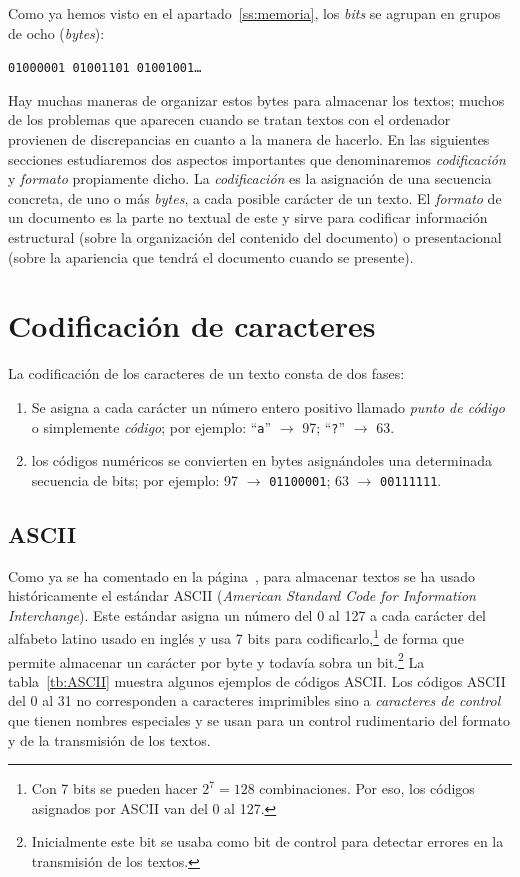 Como ya hemos visto en el apartado~\ref{ss:memoria}, los \emph{bits} se agrupan en grupos de ocho (\emph{bytes}): \begin{center} \texttt{01000001 01001101 01001001\ldots} \end{center} 

Hay muchas maneras de organizar estos bytes para almacenar los textos; muchos de los problemas que aparecen cuando se tratan textos con el ordenador provienen de discrepancias en cuanto a la manera de hacerlo. 
En las siguientes secciones estudiaremos dos aspectos importantes que denominaremos \emph{codificación} y \emph{formato} propiamente dicho. La \emph{codificación} es la asignación de una secuencia concreta, de uno o más \emph{bytes}, a cada posible carácter de un texto. El \emph{formato} de un documento es la parte no textual de este y sirve para codificar información estructural (sobre la organización del contenido del documento) o presentacional (sobre la apariencia que tendrá el documento cuando se presente). 

\section{Codificación de caracteres} La codificación de los caracteres de un texto consta de dos fases: \begin{enumerate} \item Se asigna a cada carácter un número entero positivo llamado \emph{punto de código} o simplemente \emph{código}; por ejemplo: ``\texttt{a}'' $\to$ 97; ``\texttt{?}'' $\to$ 63. \item los códigos numéricos se convierten en bytes asignándoles una determinada secuencia de bits; por ejemplo: 97 $\to$ \texttt{01100001}; 63 $\to$ \texttt{00111111}. 

\end{enumerate} 

\subsection{ASCII} Como ya se ha comentado en la página~\pageref{pg:ASCII}, para almacenar textos se ha usado históricamente el estándar ASCII (\emph{American Standard Code for Information Interchange}). Este estándar asigna un número del 0 al 127 a cada carácter del alfabeto latino usado en inglés y usa 7 bits para codificarlo,\footnote{Con 7 bits se pueden hacer $2^7=128$ combinaciones. Por eso, los códigos asignados por ASCII van del 0 al 127.} de forma que permite almacenar un carácter por byte y todavía sobra un bit.\footnote{Inicialmente este bit se usaba como bit de control para detectar errores en la transmisión de los textos.} La tabla~\ref{tb:ASCII} muestra algunos ejemplos de códigos ASCII. Los códigos ASCII del 0 al 31 no corresponden a caracteres imprimibles sino a \emph{caracteres de control} que tienen nombres especiales y se usan para un control rudimentario del formato y de la transmisión de los textos. 

